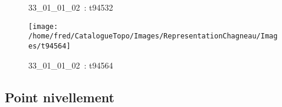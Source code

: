 \documentclass[12pt,titlepage]{book}
\begin{document}
\begin{figure}[h!]
\begin{minipage}[t]{3cm}
\begin{center}
      \caption[~33\_01\_01\_02]{\small{33\_01\_01\_02~:} \tiny{t94532}}\label{t94532}
    \end{center}
  \end{minipage}
  \begin{minipage}[t]{3cm}
    \begin{center}
      \texttt{[image: /home/fred/CatalogueTopo/Images/RepresentationChagneau/Images/t94564]}
      \caption[~33\_01\_01\_02]{\small{33\_01\_01\_02~:} \tiny{t94564}}\label{t94564}
    \end{center}
  \end{minipage}
\end{figure}


\subsection{Point nivellement}
\noindent
\vspace{\baselineskip}
\end{document}
